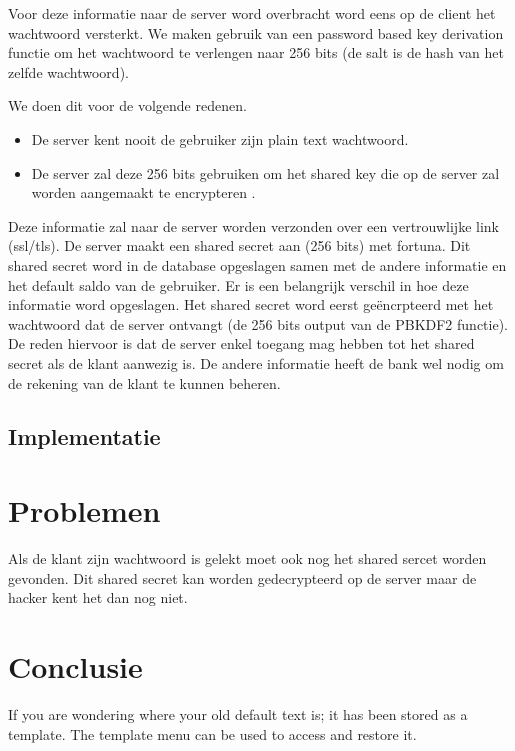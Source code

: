 \documentclass[11pt]{article}
\begin{document}
Voor deze informatie naar de server word overbracht word eens op de client het wachtwoord versterkt. We maken gebruik van een password based key derivation functie om het wachtwoord te verlengen naar 256 bits (de salt is de hash van het zelfde wachtwoord). 

We doen dit voor de volgende redenen.
\begin{itemize}
\item De server kent nooit de gebruiker zijn plain text wachtwoord. 
\item De server zal deze 256 bits gebruiken om het shared key die op de server zal worden aangemaakt te encrypteren .
\end{itemize}

Deze informatie zal naar de server worden verzonden over een vertrouwlijke link (ssl/tls). 
De server maakt een shared secret aan (256 bits) met fortuna. Dit shared secret word in de database opgeslagen samen met de andere informatie en het default saldo van de gebruiker. Er is een belangrijk verschil in hoe deze informatie word opgeslagen. Het shared secret word eerst ge\"encrpteerd met het wachtwoord dat de server ontvangt (de 256 bits output van de PBKDF2 functie). De reden hiervoor is dat de server enkel toegang mag hebben tot het shared secret als de klant aanwezig is. De andere informatie heeft de bank wel nodig om de rekening van de klant te kunnen beheren.

\subsection{Implementatie}
\section{Problemen}
Als de klant zijn wachtwoord is gelekt moet ook nog het shared sercet worden gevonden. Dit shared secret kan worden gedecrypteerd op de server maar de hacker kent het dan nog niet.
\section{Conclusie}
If you are wondering where your old default text is; it has been stored as a template. The template menu can be used to access and restore it. 

{}

\end{document}

